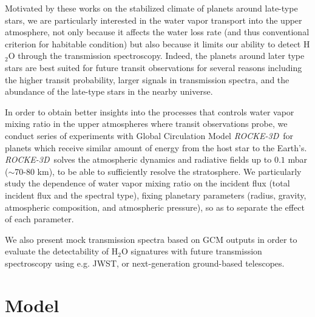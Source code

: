 \documentclass[11pt,numberedappendix,twocolappendix,]{emulateapj}
\def\water{H$_2$O }
\def\modelE{{\it ROCKE-3D}}
\def\memo#1{\color{red}$[${\bf #1}$]$ \color{black}}
\begin{document}
Motivated by these works on the stabilized climate of planets around late-type stars, we are particularly interested in the water vapor transport  into the upper atmosphere, not only because it affects the water loss rate (and thus conventional criterion for habitable condition) but also because it limits our ability to detect \water through the transmission spectroscopy. 
%
Indeed, the planets around later type stars are best suited for future transit observations for several reasons including the higher transit probability, larger signals in transmission spectra, and the abundance of the late-type stars in the nearby universe. 


In order to obtain better insights into the processes that controls water vapor mixing ratio in the upper atmospheres where transit observations probe, we conduct series of experiments with Global Circulation Model \modelE \ for planets which receive similar amount of energy from the host star to the Earth's. 
\modelE \ solves the atmospheric dynamics and radiative fields up to $0.1$ mbar ($\sim $70-80 km), to be able to sufficiently resolve the stratosphere. 
We particularly study the dependence of water vapor mixing ratio on the incident flux (total incident flux and the spectral type), fixing planetary parameters (radius, gravity, atmospheric composition, and atmospheric pressure), so as to separate the effect of each parameter. 

We also present mock transmission spectra based on GCM outputs in order to evaluate the detectability of \water signatures with future transmission spectroscopy using e.g. JWST, or next-generation ground-based telescopes. 




\section{Model}
\end{document}
